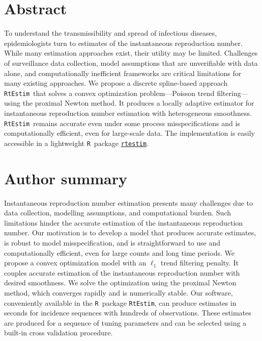 \documentclass[10pt,letterpaper]{article}
\newcommand{\R}{\texttt{R}}
\def\RtEstim{\texttt{RtEstim}}
\begin{document}
\section*{Abstract}

To understand the transmissibility and spread of infectious diseases,
epidemiologists turn to estimates of the instantaneous reproduction number.
While many estimation approaches exist, their utility may be limited. 
Challenges of surveillance data collection, model assumptions
that are unverifiable with data alone, and 
computationally inefficient frameworks are critical limitations for many
existing approaches. We propose a discrete spline-based approach 
\RtEstim\ that solves a convex optimization problem---Poisson trend filtering---using the proximal Newton method. It produces a locally adaptive 
estimator for instantaneous reproduction number estimation with heterogeneous 
smoothness. \RtEstim\ remains accurate even under some process 
misspecifications and is computationally efficient, even for large-scale 
data. The implementation is easily accessible in a lightweight \R\ 
package \href{https://dajmcdon.github.io/rtestim/index.html}{\texttt{rtestim}}.


\section*{Author summary}

Instantaneous reproduction number estimation presents many challenges due to data
collection, modelling assumptions, and computational burden. Such limitations
hinder the accurate estimation of the instantaneous reproduction number. Our
motivation is to develop a model that produces accurate estimates, is robust to
model misspecification, and is straightforward to use and computationally
efficient, even for large counts and long time periods. We propose a convex
optimization model with an $\ell_1$ trend filtering penalty. It couples accurate
estimation of the instantaneous reproduction number with desired smoothness. We
solve the optimization using the proximal Newton method, which converges rapidly
and is numerically stable. Our software, conveniently available in the \R\
package \RtEstim, can produce estimates in seconds for incidence sequences with
hundreds of observations. These estimates are produced for a sequence of tuning
parameters and can be selected using a built-in cross validation procedure. 
\end{document}
